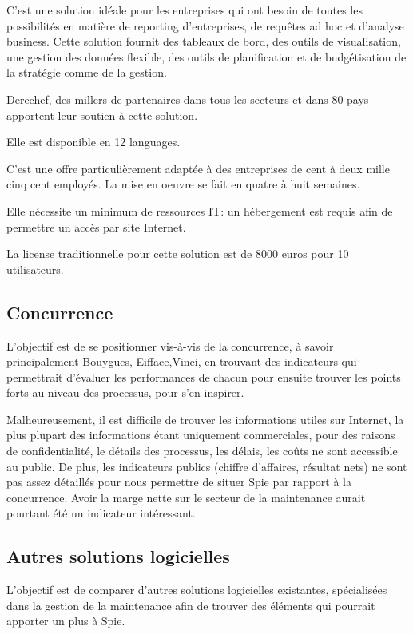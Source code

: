 C’est une solution idéale pour les entreprises qui ont besoin de toutes les possibilités en matière de reporting d’entreprises, de requêtes ad hoc et d’analyse business. Cette solution fournit des tableaux de bord, des outils de visualisation, une gestion des données flexible, des outils de planification et de budgétisation de la stratégie comme de la gestion.

Derechef, des millers de partenaires dans tous les secteurs et dans 80 pays apportent leur soutien à cette solution.

Elle est disponible en 12 languages.

C’est une offre particulièrement adaptée à des entreprises de cent à deux mille cinq cent employés. La mise en oeuvre se fait en quatre à huit semaines.

Elle nécessite un minimum de ressources IT: un hébergement est requis afin de permettre un accès par site Internet.

La license traditionnelle pour cette solution est de 8000 euros pour 10 utilisateurs.

\subsection{Concurrence}

L’objectif est de se positionner vis-à-vis de la concurrence, à savoir principalement Bouygues, Eifface,Vinci, en trouvant des indicateurs qui permettrait d’évaluer les performances de chacun pour ensuite trouver les points forts au niveau des processus, pour s’en inspirer.

Malheureusement, il est difficile de trouver les informations utiles sur Internet, la plus plupart des informations étant uniquement commerciales, pour des raisons de confidentialité, le détails des processus, les délais, les coûts ne sont accessible au public. De plus, les indicateurs publics (chiffre d’affaires, résultat nets) ne sont pas assez détaillés pour nous permettre de situer Spie par rapport à la concurrence. Avoir la marge nette sur le secteur de la maintenance aurait pourtant été un indicateur intéressant.

\subsection{Autres solutions logicielles}

L’objectif est de comparer d’autres solutions logicielles existantes, spécialisées dans la gestion de la maintenance afin de trouver des éléments qui pourrait apporter un plus à Spie.

